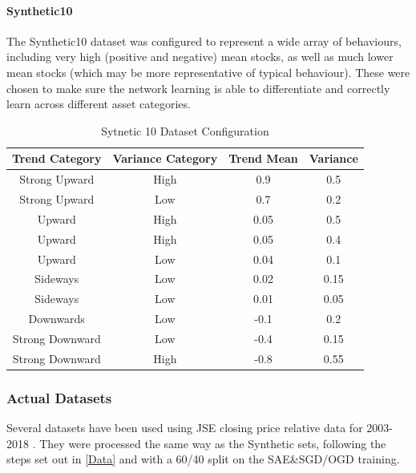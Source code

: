 \documentclass[a4paper,11pt,oneside]{article}
\theoremstyle{plain}
\theoremstyle{definition}
\begin{document}
\paragraph{Synthetic10}\label{dataset_synthetic10}

The Synthetic10 dataset was configured to represent a wide array of behaviours, including very high (positive and negative) mean stocks, as well as much lower mean stocks (which may be more representative of typical behaviour). These were chosen to make sure the network learning is able to differentiate and correctly learn across different asset categories.

	\begin{table}[h]
	\centering
	\begin{tabular}{|c|c|c|c|}
		\hline
		\textbf{Trend Category} &\textbf{Variance Category} & \textbf{Trend Mean} & \textbf{Variance}\\\hline	
		{Strong Upward} 		& {High} & {0.9} & {0.5} \\\hline
		{Strong Upward} 		& {Low} & {0.7} & {0.2} \\\hline
		{Upward} 					& {High} & {0.05} & {0.5} \\\hline
		{Upward} 					& {High} & {0.05} & {0.4} \\\hline
		{Upward} 					& {Low} & {0.04} & {0.1} \\\hline
		{Sideways} 					& {Low} & {0.02} & {0.15} \\\hline
		{Sideways}					& {Low} & {0.01} & {0.05} \\\hline
		{Downwards}				& {Low} & {-0.1} & {0.2} \\\hline
		{Strong Downward} 	& {Low} & {-0.4} & {0.15} \\\hline
		{Strong Downward}	& {High} & {-0.8} & {0.55} \\\hline
	\end{tabular}
	\newline\newline
	\caption{Sytnetic 10 Dataset Configuration}\label{tab_synth10}
\end{table}


\subsubsection{Actual Datasets}

Several datasets have been used using JSE closing price relative data for 2003-2018 . They were processed the same way as the Synthetic sets, following the steps set out in \ref{Data} and with a 60/40 split on the SAE\&SGD/OGD training.
\end{document}
